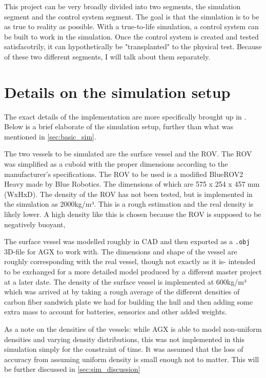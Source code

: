 \documentclass[class=article, crop=false]{standalone}
\begin{document}
This project can be very broadly divided into two segments, the simulation segment and the control system segment. The goal is that the simulation is to be as true to reality as possible. With a true-to-life simulation, a control system can be built to work in the simulation. Once the control system is created and tested satisfacotrily, it can hypothetically be "transplanted" to the physical test. Because of these two different segments, I will talk about them separately.

\section{Details on the simulation setup}
The exact details of the implementation are more specifically brought up in \cite{specialization}. Below is a brief elaborate of the simulation setup, further than what was mentioned in \cref{sec:basic_sim}.

The two vessels to be simulated are the surface vessel and the ROV. The ROV was simplified as a cuboid with the proper dimensions according to the manufacturer's specifications. The ROV to be used is a modified BlueROV2 Heavy made by Blue Robotics. The dimensions of which are 575 x 254 x 457 mm (WxHxD). The density of the ROV has not been tested, but is implemented in the simulation as 2000kg/m³. This is a rough estimation and the real density is likely lower. A high density like this is chosen because the ROV is supposed to be negatively buoyant,

The surface vessel was modelled roughly in CAD and then exported as a \texttt{.obj} 3D-file for AGX to work with. The dimensions and shape of the vessel are roughly corresponding with the real vessel, though not exactly as it is- intended to be exchanged for a more detailed model produced by a different master project at a later date. The density of the surface vessel is implemented at 600kg/m³ which was arrived at by taking a rough average of the different densities of carbon fiber sandwich plate we had for building the hull and then adding some extra mass to account for batteries, sensorics and other added weights.

As a note on the densities of the vessels: while AGX is able to model non-uniform densities and varying density distributions, this was not implemented in this simulation simply for the constraint of time. It was assumed that the loss of accuracy from assuming uniform density is small enough not to matter. This will be further discussed in \cref{sec:sim_discussion}
\end{document}
